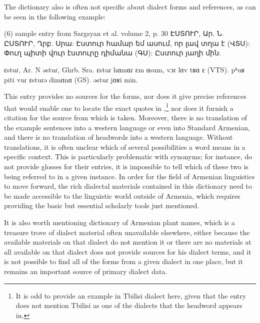 The dictionary also is often not specific about dialect forms and references, as can be seen in the following example:

\begin{exe}
	
	(6) 	sample entry from Sargsyan et al. volume 2, p. 30
	ԷՍՏՈՒՐ, Ար. Ն. ԸՍՏՈՒՐ, Ղրբ. Սրա: Էստուր համար եմ ասում, որ լավ տղա է (ՎՏՍ): Փուղ պիտի վուր էստուրը դիմանա (ԳՍ): Ըստուր յաղի մին:
	
	ɛstuɾ, Ar. N əstuɾ, Ghrb. Sra. ɛstuɾ hɑmɑɾ ɛm ɑsum, vɔɾ lɑv tʁɑ ɛ (VTS). pʰuʁ piti vuɾ ɛstuɾə dimɑnɑ (GS). əstuɾ jɑʁi min.
	
\end{exe}

This entry provides no sources for the  forms, nor does it give precise references that would enable one to locate the exact quotes in ,\footnote{It is odd to provide an example in Tbilisi dialect here, given that the entry does not mention Tbilisi as one of the dialects that the headword appears in.} nor does it furnish a citation for the source from which  is taken. Moreover, there is no translation of the example sentences into a western language or even into Standard Armenian, and there is no translation of headwords into a western language. Without translations, it is often unclear which of several possibilities a word means in a specific context. This is particularly problematic with synonyms; for instance,  do not provide glosses for their entries, it is impossible to tell which of these two is being referred to in a given instance. In order for the field of Armenian linguistics to move forward, the rich dialectal materials contained in this dictionary need to be made accessible to the linguistic world outside of Armenia, which requires providing the basic but essential scholarly tools just mentioned.

It is also worth mentioning  dictionary of Armenian plant names, which is a treasure trove of dialect material often unavailable elsewhere, either because the available materials on that dialect do not mention it  or there are no materials at all available on that dialect  does not provide sources for his dialect terms, and it is not possible to find all of the forms from a given dialect in one place, but it remains an important source of primary dialect data.

